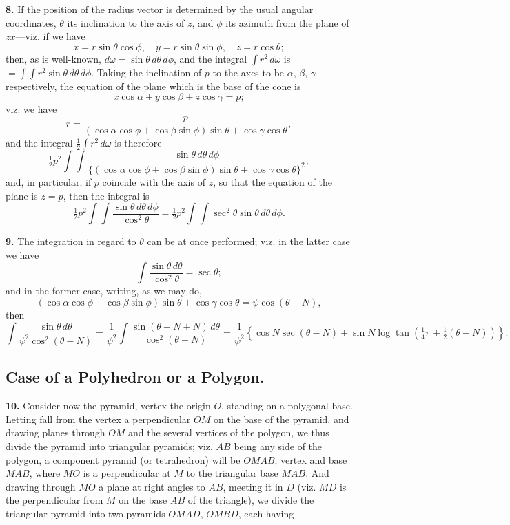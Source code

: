 \documentclass[11pt,a4paper]{article}
\begin{document}
\smallskip\noindent\textbf{8.}\quad
If the position of the radius vector is determined by the usual angular
coordinates, $\theta$ its inclination to the axis of $z$, and $\phi$ its
azimuth from the plane of $zx$---viz. if we have
\[
x = r\sin\theta\cos\phi, \quad
y = r\sin\theta\sin\phi, \quad
z = r\cos\theta;
\]
then, as is well-known, $d\omega = \sin\theta\,d\theta\,d\phi$, and the
integral $\int r^2\,d\omega$ is $= \int\!\!\int r^2\sin\theta\,d\theta\,d\phi$.
Taking the inclination of $p$ to the axes to be $\alpha$, $\beta$, $\gamma$
respectively, the equation of the plane which is the base of the cone is
\[
x\cos\alpha + y\cos\beta + z\cos\gamma = p;
\]
viz. we have
\[
r = \frac{p}{(\cos\alpha\cos\phi + \cos\beta\sin\phi)\sin\theta + \cos\gamma\cos\theta},
\]
and the integral $\tfrac{1}{2}\int r^2\,d\omega$ is therefore
\[
\tfrac{1}{2}p^2 \int\!\!\int
  \frac{\sin\theta\,d\theta\,d\phi}
       {\{ (\cos\alpha\cos\phi + \cos\beta\sin\phi)\sin\theta
          + \cos\gamma\cos\theta \}^2};
\]
and, in particular, if $p$ coincide with the axis of $z$, so that the
equation of the plane is $z=p$, then the integral is
\[
\tfrac{1}{2}p^2 \int\!\!\int \frac{\sin\theta\,d\theta\,d\phi}{\cos^2\theta}
  = \tfrac{1}{2}p^2 \int\!\!\int \sec^2\theta \sin\theta\,d\theta\,d\phi.
\]

\newpage
\noindent\textbf{9.}\quad
The integration in regard to $\theta$ can be at once performed; viz. in the
latter case we have
\[
\int \frac{\sin\theta\,d\theta}{\cos^2\theta} = \sec\theta;
\]
and in the former case, writing, as we may do,
\[
(\cos\alpha\cos\phi + \cos\beta\sin\phi)\sin\theta + \cos\gamma\cos\theta
= \psi\cos(\theta-N),
\]
then
\[
\int \frac{\sin\theta\,d\theta}{\psi^2\cos^2(\theta-N)}
= \frac{1}{\psi^2}
  \int \frac{\sin(\theta-N+N)\,d\theta}{\cos^2(\theta-N)}
= \frac{1}{\psi^2}
  \left\{
    \cos N \sec(\theta-N) + \sin N \log\tan\left(\tfrac{1}{4}\pi + \tfrac{1}{2}(\theta-N)\right)
  \right\}.
\]

\subsection*{Case of a Polyhedron or a Polygon.}

\smallskip\noindent\textbf{10.}\quad
Consider now the pyramid, vertex the origin $O$, standing on a polygonal
base. Letting fall from the vertex a perpendicular $OM$ on the base of the
pyramid, and drawing planes through $OM$ and the several vertices of the
polygon, we thus divide the pyramid into triangular pyramids; viz. $AB$ being
any side of the polygon, a component pyramid (or tetrahedron) will be $OMAB$,
vertex and base $MAB$, where $MO$ is a perpendicular at $M$ to the triangular
base $MAB$. And drawing through $MO$ a plane at right angles to $AB$, meeting
it in $D$ (viz. $MD$ is the perpendicular from $M$ on the base $AB$ of the
triangle), we divide the triangular pyramid into two pyramids $OMAD$, $OMBD$,
each having
\end{document}
